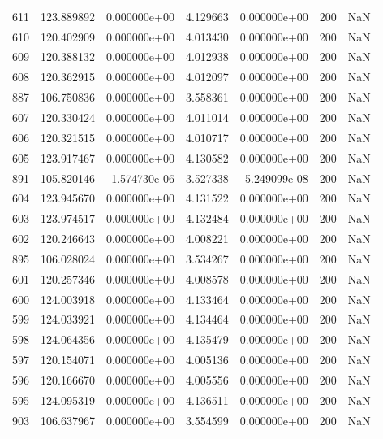 \begin{tabular}{rrrrrrr}
 611 & 123.889892 &  0.000000e+00 &  4.129663 &  0.000000e+00 &         200 & NaN \\
 610 & 120.402909 &  0.000000e+00 &  4.013430 &  0.000000e+00 &         200 & NaN \\
 609 & 120.388132 &  0.000000e+00 &  4.012938 &  0.000000e+00 &         200 & NaN \\
 608 & 120.362915 &  0.000000e+00 &  4.012097 &  0.000000e+00 &         200 & NaN \\
 887 & 106.750836 &  0.000000e+00 &  3.558361 &  0.000000e+00 &         200 & NaN \\
 607 & 120.330424 &  0.000000e+00 &  4.011014 &  0.000000e+00 &         200 & NaN \\
 606 & 120.321515 &  0.000000e+00 &  4.010717 &  0.000000e+00 &         200 & NaN \\
 605 & 123.917467 &  0.000000e+00 &  4.130582 &  0.000000e+00 &         200 & NaN \\
 891 & 105.820146 & -1.574730e-06 &  3.527338 & -5.249099e-08 &         200 & NaN \\
 604 & 123.945670 &  0.000000e+00 &  4.131522 &  0.000000e+00 &         200 & NaN \\
 603 & 123.974517 &  0.000000e+00 &  4.132484 &  0.000000e+00 &         200 & NaN \\
 602 & 120.246643 &  0.000000e+00 &  4.008221 &  0.000000e+00 &         200 & NaN \\
 895 & 106.028024 &  0.000000e+00 &  3.534267 &  0.000000e+00 &         200 & NaN \\
 601 & 120.257346 &  0.000000e+00 &  4.008578 &  0.000000e+00 &         200 & NaN \\
 600 & 124.003918 &  0.000000e+00 &  4.133464 &  0.000000e+00 &         200 & NaN \\
 599 & 124.033921 &  0.000000e+00 &  4.134464 &  0.000000e+00 &         200 & NaN \\
 598 & 124.064356 &  0.000000e+00 &  4.135479 &  0.000000e+00 &         200 & NaN \\
 597 & 120.154071 &  0.000000e+00 &  4.005136 &  0.000000e+00 &         200 & NaN \\
 596 & 120.166670 &  0.000000e+00 &  4.005556 &  0.000000e+00 &         200 & NaN \\
 595 & 124.095319 &  0.000000e+00 &  4.136511 &  0.000000e+00 &         200 & NaN \\
 903 & 106.637967 &  0.000000e+00 &  3.554599 &  0.000000e+00 &         200 & NaN \\

\end{tabular}
